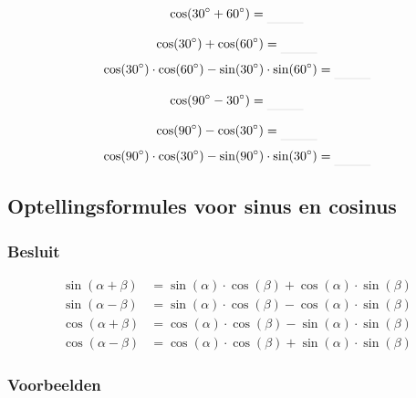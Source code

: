 \documentclass[a4paper,12pt]{article}
\begin{document}
\begin{minipage}{0.4\textwidth}
  $$\cos(30\degree + 60\degree)=\arule{1cm}$$
\end{minipage}
\begin{minipage}{0.5\textwidth}
  $$\cos(30\degree) + \cos(60\degree)=\arule{1cm}$$
  $$\cos(30\degree)\cdot\cos(60\degree)-\sin(30\degree)\cdot\sin(60\degree)=\arule{1cm}$$
\end{minipage}

\begin{minipage}{0.4\textwidth}
  $$\cos(90\degree - 30\degree)=\arule{1cm}$$
\end{minipage}
\begin{minipage}{0.5\textwidth}
  $$\cos(90\degree) - \cos(30\degree)=\arule{1cm}$$
  $$\cos(90\degree)\cdot\cos(30\degree)-\sin(90\degree)\cdot\sin(30\degree)=\arule{1cm}$$
\end{minipage}



\subsection{Optellingsformules voor sinus en cosinus}

\subsubsection*{Besluit}
\begin{align*}
  \sin(\alpha + \beta)&=\sin(\alpha)\cdot \cos(\beta)+\cos(\alpha)\cdot \sin(\beta)\\
  \sin(\alpha - \beta)&=\sin(\alpha)\cdot \cos(\beta)-\cos(\alpha)\cdot \sin(\beta)\\
  \cos(\alpha + \beta)&=\cos(\alpha)\cdot \cos(\beta)-\sin(\alpha)\cdot \sin(\beta)\\
  \cos(\alpha - \beta)&=\cos(\alpha)\cdot \cos(\beta)+\sin(\alpha)\cdot \sin(\beta)
\end{align*}


\subsubsection*{Voorbeelden}
\end{document}
